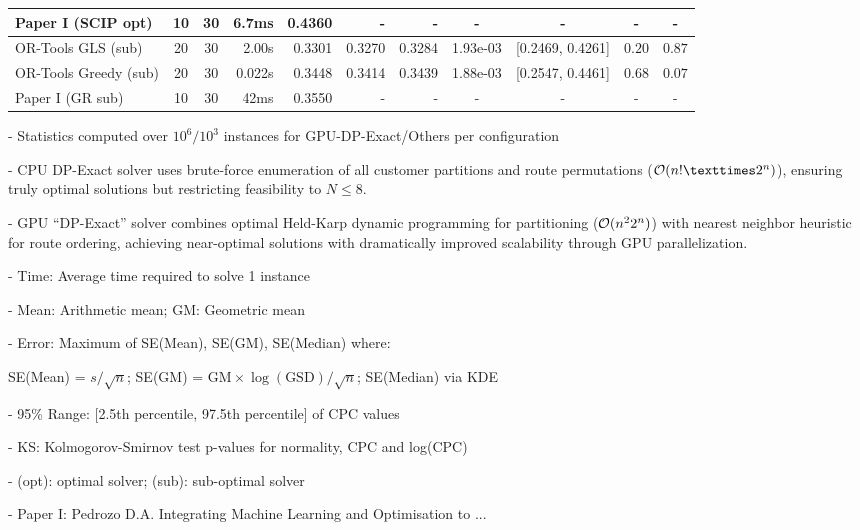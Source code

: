 \documentclass[a4paper,twoside]{article}
\begin{document}
\begin{table}[htbp]
\begin{tabular}{@{}l c c r r r r c c c c@{}}
\rowcolor{gray!20}  Paper I (SCIP opt)    & 10 & 30 & 6.7ms  & 0.4360 & -      & -      & -        & - & - &- \\             
\midrule
OR-Tools GLS (sub)    & 20 & 30 & 2.00s & 0.3301 & 0.3270 & 0.3284 & 1.93e-03 & [0.2469, 0.4261] & $0.20$ & $0.87$ \\
OR-Tools Greedy (sub) & 20 & 30 & 0.022s & 0.3448 & 0.3414 & 0.3439 & 1.88e-03 & [0.2547, 0.4461] & $0.68$ & $0.07$ \\
\rowcolor{gray!20}  Paper I (GR sub)      & 10 & 30 & 42ms  & 0.3550 & -      & -      & -        & - & - &- \\             
\bottomrule
\end{tabular}
\begin{tablenotes}
\small
\item - Statistics computed over $10^6/10^3$ instances for GPU-DP-Exact/Others per configuration
\item - CPU DP-Exact solver uses brute-force enumeration of all customer partitions and route permutations (${\cal O}(n! × 2^n)$), ensuring truly optimal solutions but restricting feasibility to $N\le 8$. 
\item - GPU ``DP-Exact'' solver combines optimal Held-Karp dynamic programming for partitioning (${\cal O}(n^2 2^n)$) with nearest neighbor heuristic for route ordering, achieving near-optimal solutions with dramatically improved scalability through GPU parallelization.
\item - Time: Average time required to solve 1 instance
\item - Mean: Arithmetic mean; GM: Geometric mean
\item - Error: Maximum of SE(Mean), SE(GM), SE(Median) where:
\item \quad SE(Mean) = $s/\sqrt{n}$; SE(GM) = $\text{GM} \times \log(\text{GSD})/\sqrt{n}$; SE(Median) via KDE
\item - 95\% Range: [2.5th percentile, 97.5th percentile] of CPC values
\item - KS: Kolmogorov-Smirnov test p-values for normality, CPC and log(CPC)
\item - (opt): optimal solver; (sub): sub-optimal solver
\item - Paper I: Pedrozo D.A. Integrating Machine Learning and Optimisation to ...
\end{tablenotes}
\end{table}
\end{document}
